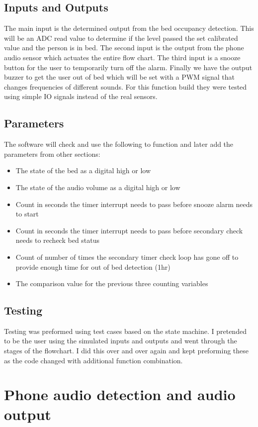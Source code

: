 \documentclass[11pt]{article}
\begin{document}
\subsection*{Inputs and Outputs}
The main input is the determined output from the bed occupancy detection. 
This will be an ADC read value to determine if the level passed the set calibrated value and the person is in bed. 
The second input is the output from the phone audio sensor which actuates the entire flow chart. 
The third input is a snooze button for the user to temporarily turn off the alarm.
Finally we have the output buzzer to get the user out of bed which will be set with a PWM signal that changes frequencies of different sounds. 
For this function build they were tested using simple IO signals instead of the real sensors.

\subsection*{Parameters}
The software will check and use the following to function and later add the parameters from other sections:
\begin{itemize}
	\item The state of the bed as a digital high or low
	\item The state of the audio volume as a digital high or low 
	\item Count in seconds the timer interrupt needs to pass before snooze alarm needs to start
	\item Count in seconds the timer interrupt needs to pass before secondary check needs to recheck bed status
	\item Count of number of times the secondary timer check loop has gone off to provide enough time for out of bed detection (1hr)
	\item The comparison value for the previous three counting variables 
\end{itemize}


\subsection*{Testing}
Testing was preformed using test cases based on the state machine. 
I pretended to be the user using the simulated inputs and outputs and went through the stages of the flowchart.
I did this over and over again and kept preforming these as the code changed with additional function combination. 

\section{Phone audio detection and audio output}
\end{document}
